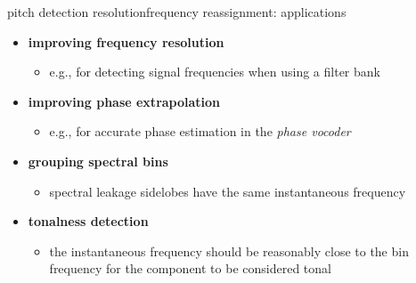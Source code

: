             
        \begin{frame}{pitch detection resolution}{frequency reassignment: applications}
            \begin{itemize}
                \item \textbf{improving frequency resolution}
                    \begin{itemize}
                        \item e.g., for detecting signal frequencies when using a filter bank
                    \end{itemize}
                \bigskip
                \item<2-> \textbf{improving phase extrapolation}
                    \begin{itemize}
                        \item e.g., for accurate phase estimation in the \textit{phase vocoder}
                    \end{itemize}
                \bigskip
                \item<3-> \textbf{grouping spectral bins}
                    \begin{itemize}
                        \item spectral leakage sidelobes have the same instantaneous frequency
                    \end{itemize}
                \bigskip
                \item<4-> \textbf{tonalness detection}
                    \begin{itemize}
                        \item   the instantaneous frequency should be reasonably close to the bin frequency for the component to be considered tonal
                    \end{itemize}
            \end{itemize}
        \end{frame}
        
